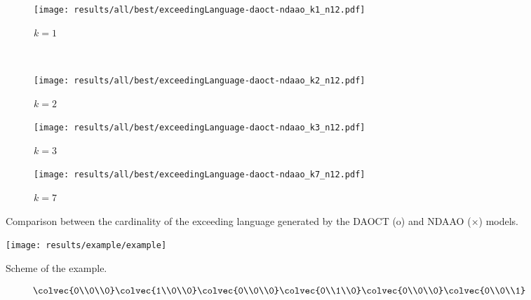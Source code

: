 \begin{figure}[H]
  \begin{subfigure}[H]{0.5\textwidth}
    \centering
    \texttt{[image: results/all/best/exceedingLanguage-daoct-ndaao\_k1\_n12.pdf]}
    \caption{$k=1$}
    \label{fig:daoctNdaaoBestkone}
  \end{subfigure}
  ~
  \begin{subfigure}[h]{0.5\textwidth}
    \centering
    \texttt{[image: results/all/best/exceedingLanguage-daoct-ndaao\_k2\_n12.pdf]}
    \caption{$k=2$}
    \label{fig:daoctNdaaoBestktwo}
  \end{subfigure}
  \begin{subfigure}[h]{0.5\textwidth}
    \centering
    \texttt{[image: results/all/best/exceedingLanguage-daoct-ndaao\_k3\_n12.pdf]}
    \caption{$k=3$}
    \label{fig:daoctNdaaoBestkthree}
  \end{subfigure}
  \begin{subfigure}[h]{0.5\textwidth}
    \centering
    \texttt{[image: results/all/best/exceedingLanguage-daoct-ndaao\_k7\_n12.pdf]}
    \caption{$k=7$}
    \label{fig:daoctNdaaoBestkseven}
  \end{subfigure}
  \caption[Comparison between the cardinality of the exceeding language generated by the DAOCT and
NDAAO.]{Comparison between the cardinality of the exceeding language generated by the DAOCT (o) and
NDAAO ($\times$) models.}
\end{figure}
\begin{figure}[H]
  \centering
  \texttt{[image: results/example/example]}
  \caption{Scheme of the example.}
    \label{fig:schemeExConveyor}
\end{figure}
\begin{align}
  \label{motif}
\colvec{0\\0\\0}\colvec{1\\0\\0}\colvec{0\\0\\0}\colvec{0\\1\\0}\colvec{0\\0\\0}\colvec{0\\0\\1}
\end{align}

